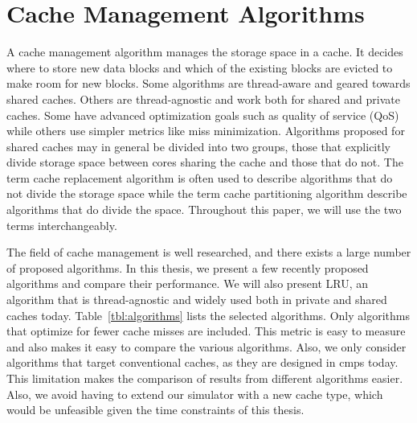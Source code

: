 
\chapter{Cache Management Algorithms}
\label{cpt:algorithms}


A cache management algorithm manages the storage space in a cache.
It decides where to store new data blocks and which of the existing blocks are evicted to make room for new blocks.
Some algorithms are thread-aware and geared towards shared caches.
Others are thread-agnostic and work both for shared and private caches.
Some have advanced optimization goals such as quality of service (QoS) while others use simpler metrics like miss minimization.
Algorithms proposed for shared caches may in general be divided into two groups, those that explicitly divide storage space between cores sharing the cache and those that do not.
The term cache replacement algorithm is often used to describe algorithms that do not divide the storage space while the term cache partitioning algorithm describe algorithms that do divide the space.
Throughout this paper, we will use the two terms interchangeably.

The field of cache management is well researched, and there exists a large number of proposed algorithms.
In this thesis, we present a few recently proposed algorithms and compare their performance.
We will also present LRU, an algorithm that is thread-agnostic and widely used both in private and shared caches today.
Table~\ref{tbl:algorithms} lists the selected algorithms.
Only algorithms that optimize for fewer cache misses are included.
This metric is easy to measure and also makes it easy to compare the various algorithms.
Also, we only consider algorithms that target conventional caches, as they are designed in \glspl{cmp} today.
This limitation makes the comparison of results from different algorithms easier.
Also, we avoid having to extend our simulator with a new cache type, which would be unfeasible given the time constraints of this thesis.

